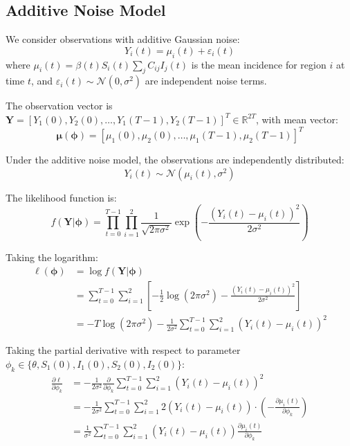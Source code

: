\subsection{Additive Noise Model}

We consider observations with additive Gaussian noise:
\begin{equation}
Y_i(t) = \mu_i(t) + \varepsilon_i(t)
\end{equation}
where $\mu_i(t) = \beta(t) S_i(t) \sum_j C_{ij} I_j(t)$ is the mean incidence for region $i$ at time $t$, and $\varepsilon_i(t) \sim \mathcal{N}(0, \sigma^2)$ are independent noise terms.

The observation vector is $\mathbf{Y} = [Y_1(0), Y_2(0), \ldots, Y_1(T-1), Y_2(T-1)]^T \in \mathbb{R}^{2T}$, with mean vector:
\begin{equation}
\boldsymbol{\mu}(\boldsymbol{\phi}) = [\mu_1(0), \mu_2(0), \ldots, \mu_1(T-1), \mu_2(T-1)]^T
\end{equation}

Under the additive noise model, the observations are independently distributed:
\begin{equation}
Y_i(t) \sim \mathcal{N}(\mu_i(t), \sigma^2)
\end{equation}

The likelihood function is:
\begin{equation}
f(\mathbf{Y}|\boldsymbol{\phi}) = \prod_{t=0}^{T-1} \prod_{i=1}^{2} \frac{1}{\sqrt{2\pi\sigma^2}} \exp\left(-\frac{(Y_i(t) - \mu_i(t))^2}{2\sigma^2}\right)
\end{equation}

Taking the logarithm:
\begin{align}
\ell(\boldsymbol{\phi}) &= \log f(\mathbf{Y}|\boldsymbol{\phi}) \\
&= \sum_{t=0}^{T-1} \sum_{i=1}^{2} \left[-\frac{1}{2}\log(2\pi\sigma^2) - \frac{(Y_i(t) - \mu_i(t))^2}{2\sigma^2}\right] \\
&= -T\log(2\pi\sigma^2) - \frac{1}{2\sigma^2}\sum_{t=0}^{T-1}\sum_{i=1}^{2} (Y_i(t) - \mu_i(t))^2
\end{align}

Taking the partial derivative with respect to parameter $\phi_k \in
\{\theta, S_1(0), I_1(0), S_2(0), I_2(0)\}$:
\begin{align*}
\frac{\partial \ell}{\partial \phi_k} &= -\frac{1}{2\sigma^2} \frac{\partial}{\partial \phi_k}\sum_{t=0}^{T-1}\sum_{i=1}^{2} (Y_i(t) - \mu_i(t))^2 \\
&= -\frac{1}{2\sigma^2} \sum_{t=0}^{T-1}\sum_{i=1}^{2} 2(Y_i(t) - \mu_i(t)) \cdot \left(-\frac{\partial \mu_i(t)}{\partial \phi_k}\right) \\
&= \frac{1}{\sigma^2} \sum_{t=0}^{T-1}\sum_{i=1}^{2} (Y_i(t) - \mu_i(t)) \frac{\partial \mu_i(t)}{\partial \phi_k}
\end{align*}

